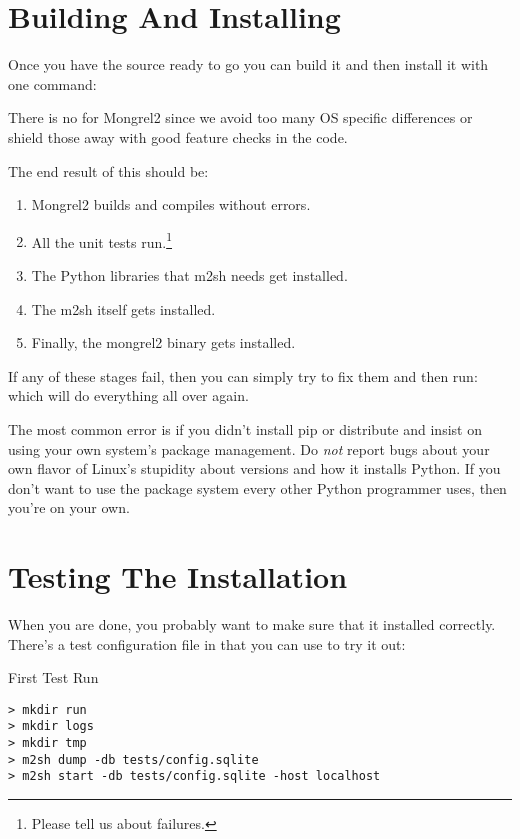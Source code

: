 \section{Building And Installing}

Once you have the source ready to go you can build it and then install it with
one command:  

There is no  for Mongrel2 since we avoid too many OS specific
differences or shield those away with good feature checks in the code.

The end result of this should be:

\begin{enumerate}
\item Mongrel2 builds and compiles without errors.
\item All the unit tests run.\footnote{Please tell us about failures.}
\item The Python libraries that m2sh needs get installed.
\item The m2sh itself gets installed.
\item Finally, the mongrel2 binary gets installed.
\end{enumerate}

If any of these stages fail, then you can simply try to fix them and then
run:   which will do everything all over again.

The most common error is if you didn't install pip or distribute and insist
on using your own system's package management.  Do \emph{not} report bugs about
your own flavor of Linux's stupidity about versions and how it installs Python.
If you don't want to use the package system every other Python programmer uses,
then you're on your own.


\section{Testing The Installation}

When you are done, you probably want to make sure that it installed correctly.
There's a test configuration file in  that you can
use to try it out:

\begin{code}{First Test Run}
\begin{lstlisting}
> mkdir run
> mkdir logs
> mkdir tmp
> m2sh dump -db tests/config.sqlite
> m2sh start -db tests/config.sqlite -host localhost
\end{lstlisting}
\end{code}

